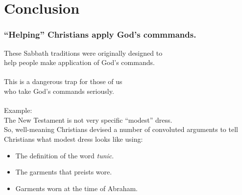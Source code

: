 \section*{Conclusion}

\begin{frame}
\frametitle{``Helping'' Christians apply God's commmands.}
These Sabbath traditions were originally designed to\\
help people make application of God's commands.\\~\\
This is a dangerous trap for those of us\\who take God's commands seriously.\\~\\
Example:\\
The New Testament is not very specific ``modest'' dress.\\
So, well-meaning Christians devised a number of convoluted arguments to tell Christians what modest dress looks like using:
\begin{itemize}
\item The definition of the word \emph{tunic}.
\item The garments that preists wore.
\item Garments worn at the time of Abraham.
\end{itemize}

\end{frame}

\begin{frame}
\frametitle{\insertlecture}
\tableofcontents[sectionstyle=show/show]
\end{frame}


